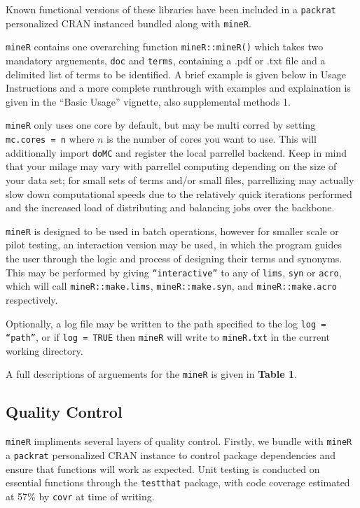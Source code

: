 \documentclass[twoside]{article}
\begin{document}
Known functional versions of these libraries have been included in a \texttt{packrat} personalized CRAN instanced bundled along with \texttt{mineR}.

\texttt{mineR} contains one overarching function \texttt{mineR::mineR()} which takes two mandatory arguements, \texttt{doc} and \texttt{terms}, containing a .pdf or .txt file and a \texttt{\n} delimited list of terms to be identified. A brief example is given below in Usage Instructions and a more complete runthrough with examples and explaination is given in the ``Basic Usage'' vignette, also supplemental methods 1. 

\texttt{mineR} only uses one core by default, but may be multi corred by setting \texttt{mc.cores = n} where $n$ is the number of cores you want to use. This will additionally import \texttt{doMC} and register the local parrellel backend. Keep in mind that your milage may vary with parrellel computing depending on the size of your data set; for small sets of terms and/or small files, parrellizing may actually slow down computational speeds due to the relatively quick iterations performed and the increased load of distributing and balancing jobs over the backbone. 

\texttt{mineR} is designed to be used in batch operations, however for smaller scale or pilot testing, an interaction version may be used, in which the program guides the user through the logic and process of designing their terms and synonyms. This may be performed by giving \texttt{``interactive''} to any of \texttt{lims}, \texttt{syn} or \texttt{acro}, which will call \texttt{mineR::make.lims}, \texttt{mineR::make.syn}, and \texttt{mineR::make.acro} respectively. 

Optionally, a log file may be written to the path specified to the log \texttt{log = ``path''}, or if \texttt{log = TRUE} then \texttt{mineR} will write to \texttt{mineR.txt} in the current working directory. 

A full descriptions of arguements for the \texttt{mineR} is given in \textbf{Table 1}.

\subsection{Quality Control}

\texttt{mineR} impliments several layers of quality control. Firstly, we bundle with \texttt{mineR} a \texttt{packrat} personalized CRAN instance to control package dependencies and ensure that functions will work as expected. Unit testing is conducted on essential functions through the \texttt{testthat} package, with code coverage estimated at 57\% by \texttt{covr} at time of writing. 
\end{document}
